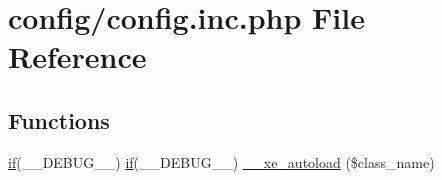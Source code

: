 \hypertarget{config_8inc_8php}{\section{config/config.inc.\-php File Reference}
\label{config_8inc_8php}
}
\subsection*{Functions}
\begin{DoxyCompactItemize}
\item 
\hyperlink{index_8php_a89c9c4ffebb12a316e28d000a981cf89}{if}(\-\_\-\-\_\-\-D\-E\-B\-U\-G\-\_\-\-\_\-) \hyperlink{index_8php_a89c9c4ffebb12a316e28d000a981cf89}{if}(\-\_\-\-\_\-\-D\-E\-B\-U\-G\-\_\-\-\_\-) \hyperlink{config_8inc_8php_aaedb2cb21b9e698e69dd7f8ef06618f2}{\-\_\-\-\_\-xe\-\_\-autoload} (\$class\-\_\-name)
\end{DoxyCompactItemize}
